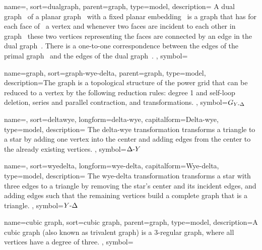 {
    name={\dualgraph},
    sort={dualgraph},
    parent={graph},
    type={model},
    description={ A dual graph~ of a planar
    graph~ with a fixed planar embedding~
    is a graph that has for each face of~ a vertex and whenever
    two faces are incident to each other in graph~ these two
    vertices representing the faces are connected by an edge in the dual
    graph~. There is a one-to-one correspondence between
    the edges of the primal graph~ and the edges of the dual
    graph~. },
    symbol={\dualgraph}
}

{
    name={\wyedelta graph},
    sort={graph-wye-delta},
    parent={graph},
    type={model},
    description={The  graph is a topological structure of
    the power grid that can be reduced to a vertex by the following reduction
    rules: degree 1 and self-loop deletion, series and parallel contraction, and
     transformations.
    },
    symbol={\ensuremath{\graph_{\wyedelta}}}
}

{
    name={\deltawye},
    sort={deltawye},
    longform={delta-wye},
    capitalform={Delta-wye},
    type={model},
    description={
    The delta-wye transformation transforms a triangle to a star by adding one
    vertex into the center and adding edges from the center to the already
    existing vertices.
    },
    symbol={\ensuremath{\deltawye}}
}

{
    name={\wyedelta},
    sort={wyedelta},
    longform={wye-delta},
    capitalform={Wye-delta},
    type={model},
    description={
    The wye-delta transformation transforms a star with three edges to a
    triangle by removing the star's center and its incident edges, and adding
    edges such that the remaining vertices build a complete graph that is a
    triangle.
    },
    symbol={\ensuremath{\wyedelta}}
}

{
    name={cubic graph},
    sort={cubic graph},
    parent={graph},
    type={model},
    description={A cubic graph (also known as trivalent graph) is a 3-regular
    graph, where all vertices have a degree of three.
    },
    symbol={}
}

